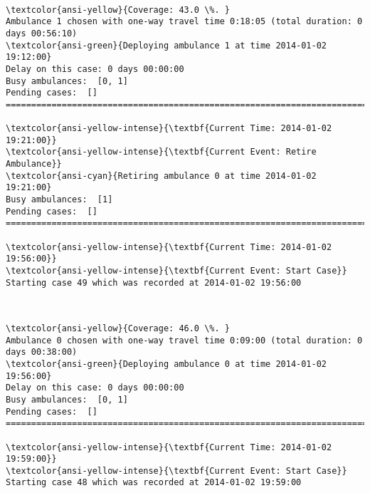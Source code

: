 \documentclass[11pt]{article}
\begin{document}
    \begin{center}
    \end{center}
    { \hspace*{\fill} \\}
    
    \begin{Verbatim}[commandchars=\\\{\}]
\textcolor{ansi-yellow}{Coverage: 43.0 \%. }
Ambulance 1 chosen with one-way travel time 0:18:05 (total duration: 0 days 00:56:10)
\textcolor{ansi-green}{Deploying ambulance 1 at time 2014-01-02 19:12:00}
Delay on this case: 0 days 00:00:00
Busy ambulances:  [0, 1]
Pending cases:  []
========================================================================

\textcolor{ansi-yellow-intense}{\textbf{Current Time: 2014-01-02 19:21:00}}
\textcolor{ansi-yellow-intense}{\textbf{Current Event: Retire Ambulance}}
\textcolor{ansi-cyan}{Retiring ambulance 0 at time 2014-01-02 19:21:00}
Busy ambulances:  [1]
Pending cases:  []
========================================================================

\textcolor{ansi-yellow-intense}{\textbf{Current Time: 2014-01-02 19:56:00}}
\textcolor{ansi-yellow-intense}{\textbf{Current Event: Start Case}}
Starting case 49 which was recorded at 2014-01-02 19:56:00

    \end{Verbatim}

    \begin{center}
    \end{center}
    { \hspace*{\fill} \\}
    
    \begin{Verbatim}[commandchars=\\\{\}]
\textcolor{ansi-yellow}{Coverage: 46.0 \%. }
Ambulance 0 chosen with one-way travel time 0:09:00 (total duration: 0 days 00:38:00)
\textcolor{ansi-green}{Deploying ambulance 0 at time 2014-01-02 19:56:00}
Delay on this case: 0 days 00:00:00
Busy ambulances:  [0, 1]
Pending cases:  []
========================================================================

\textcolor{ansi-yellow-intense}{\textbf{Current Time: 2014-01-02 19:59:00}}
\textcolor{ansi-yellow-intense}{\textbf{Current Event: Start Case}}
Starting case 48 which was recorded at 2014-01-02 19:59:00

    \end{Verbatim}
\end{document}
